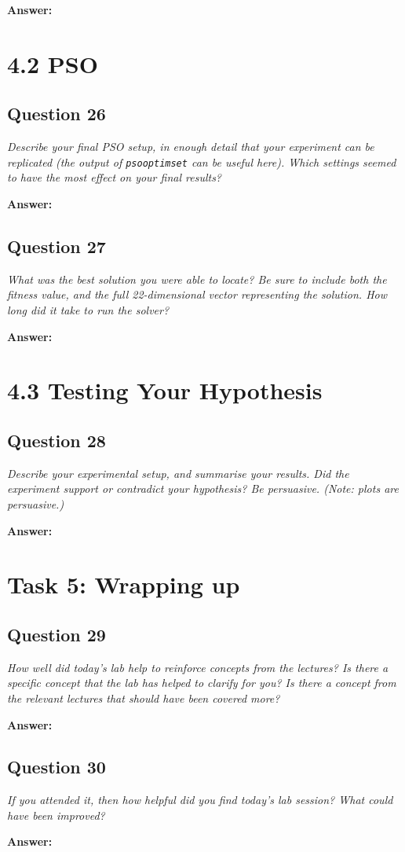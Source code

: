 \documentclass[a4paper]{article}
\begin{document}
\textbf{Answer:}

\section*{4.2 PSO}

\subsection*{Question 26}
\emph{Describe your final PSO setup, in enough detail that your experiment can be replicated (the output of \texttt{psooptimset} can be useful here). Which settings seemed to have the most effect on your final results?}

\textbf{Answer:}

\subsection*{Question 27}
\emph{What was the best solution you were able to locate? Be sure to
include both the fitness value, and the full 22-dimensional vector representing the solution. How long did it take to run the solver?}

\textbf{Answer:}

\section*{4.3 Testing Your Hypothesis}

\subsection*{Question 28}
\emph{Describe your experimental setup, and summarise your results.
Did the experiment support or contradict your hypothesis? Be persuasive. (Note: plots are persuasive.)}

\textbf{Answer:}

\section*{Task 5: Wrapping up}

\subsection*{Question 29}
\emph{How well did today's lab help to reinforce concepts from the
lectures? Is there a specific concept that the lab has helped to clarify for you? Is there a concept from the relevant lectures that should have been covered more?}

\textbf{Answer:}

\subsection*{Question 30}
\emph{If you attended it, then how helpful did you find today's lab
session? What could have been improved?}

\textbf{Answer:}
\end{document}
